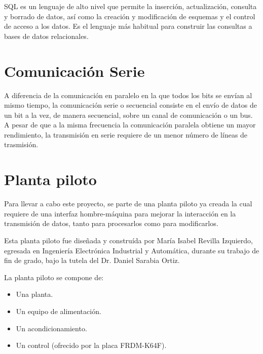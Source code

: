 SQL es un lenguaje de alto nivel que permite la inserción, actualización, consulta y borrado de datos, así como la creación y modificación de esquemas y el control de acceso a los datos. Es el lenguaje más habitual para construir las consultas a bases de datos relacionales.

\section{Comunicación Serie}

A diferencia de la comunicación en paralelo en la que todos los bits se envían al mismo tiempo, la comunicación serie o secuencial consiste en el envío de datos de un bit a la vez, de manera secuencial, sobre un canal de comunicación o un bus. A pesar de que a la misma frecuencia la comunicación paralela obtiene un mayor rendimiento, la transmisión en serie requiere de un menor número de líneas de trasmisión.



\section{Planta piloto}

Para llevar a cabo este proyecto, se parte de una planta piloto ya creada la cual requiere de una interfaz hombre-máquina para mejorar la interacción en la transmisión de datos, tanto para procesarlos como para modificarlos.

Esta planta piloto fue diseñada y construída por María Isabel Revilla Izquierdo, egresada en Ingeniería Electrónica Industrial y Automática, durante su trabajo de fin de grado, bajo la tutela del Dr. Daniel Sarabia Ortiz.

La planta piloto se compone de:
\begin{itemize}
	\item Una planta.
	\item Un equipo de alimentación.
	\item Un acondicionamiento.
	\item Un control (ofrecido por la placa FRDM-K64F).
\end{itemize} 


